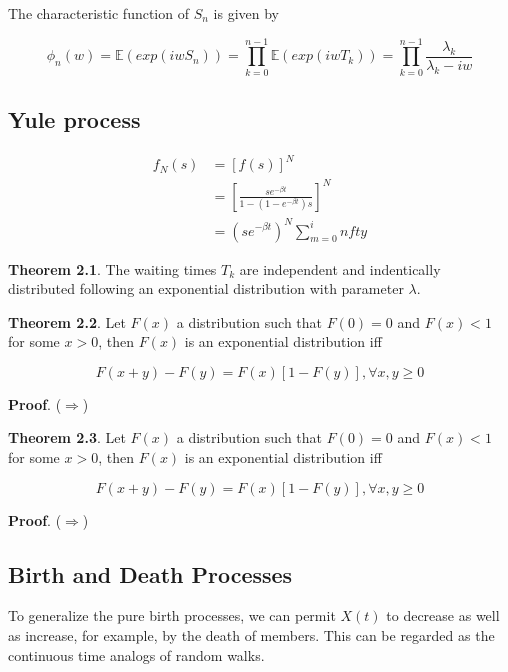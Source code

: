 \documentclass[12pt]{article}
\theoremstyle{nonumberbreak}
\begin{document}
The characteristic function of $S_n$ is given by

$$
\phi_n(w) = \mathbb{E}(exp(iwS_n)) = \prod_{k=0}^{n-1} \mathbb{E}(exp(iw T_k)) = \prod_{k=0}^{n-1} \frac{\lambda_k}{\lambda_k - iw}
$$


\subsection{Yule process}



$$
\begin{aligned}
f_N(s) &= [f(s)]^N \\[8pt]
&= \left[ \frac{se^{-\beta t}}{1 - (1-e^{-\beta t})s} \right]^N \\[8pt]
&= (s e^{-\beta t})^N \sum_{m=0}^infty 
\end{aligned}
$$




\begin{theorem}
\textbf{Theorem 2.1}. The waiting times $T_k$ are independent and indentically distributed following an exponential distribution with parameter $\lambda$. 
\end{theorem}



\begin{theorem}
\textbf{Theorem 2.2}. Let $F(x)$ a distribution such that $F(0) = 0$ and $F(x) < 1$ for some $x >0 $, then $F(x)$ is an exponential distribution iff

$$
F(x+y) - F(y) = F(x)[1-F(y)], \forall x,y \ge 0
$$
\end{theorem}

\textbf{Proof}. ($\Rightarrow$) 




\begin{theorem}
\textbf{Theorem 2.3}. Let $F(x)$ a distribution such that $F(0) = 0$ and $F(x) < 1$ for some $x >0 $, then $F(x)$ is an exponential distribution iff

$$
F(x+y) - F(y) = F(x)[1-F(y)], \forall x,y \ge 0
$$
\end{theorem}

\textbf{Proof}. ($\Rightarrow$) 




\subsection{Birth and Death Processes}

To generalize the pure birth processes, we can permit $X(t)$ to decrease as well as increase, for example, by the death of members. This can be regarded as the continuous time analogs of random walks. 
\end{document}
